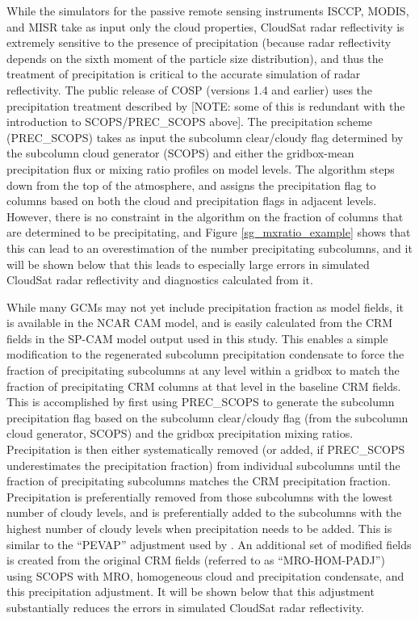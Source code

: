 While the simulators for the passive remote sensing instruments ISCCP, MODIS, and MISR take as input only the cloud properties, CloudSat radar reflectivity is extremely sensitive to the presence of precipitation (because radar reflectivity depends on the sixth moment of the particle size distribution), and thus the treatment of precipitation is critical to the accurate simulation of radar reflectivity. The public release of COSP (versions 1.4 and earlier) uses the precipitation treatment described by \cite{zhang_et_al_2010} [NOTE: some of this is redundant with the introduction to SCOPS/PREC\_SCOPS above]. The precipitation scheme (PREC\_SCOPS) takes as input the subcolumn clear/cloudy flag determined by the subcolumn cloud generator (SCOPS) and either the gridbox-mean precipitation flux or mixing ratio profiles on model levels. The algorithm steps down from the top of the atmosphere, and assigns the precipitation flag to columns based on both the cloud and precipitation flags in adjacent levels. However, there is no constraint in the algorithm on the fraction of columns that are determined to be precipitating, and Figure \ref{sg_mxratio_example} shows that this can lead to an overestimation of the number precipitating subcolumns, and it will be shown below that this leads to especially large errors in simulated CloudSat radar reflectivity and diagnostics calculated from it.

While many GCMs may not yet include precipitation fraction as model fields, it is available in the NCAR CAM model, and is easily calculated from the CRM fields in the SP-CAM model output used in this study. This enables a simple modification to the regenerated subcolumn precipitation condensate to force the fraction of precipitating subcolumns at any level within a gridbox to match the fraction of precipitating CRM columns at that level in the baseline CRM fields. This is accomplished by first using PREC\_SCOPS to generate the subcolumn precipitation flag based on the subcolumn clear/cloudy flag (from the subcolumn cloud generator, SCOPS) and the gridbox precipitation mixing ratios. Precipitation is then either systematically removed (or added, if PREC\_SCOPS underestimates the precipitation fraction) from individual subcolumns until the fraction of precipitating subcolumns matches the CRM precipitation fraction. Precipitation is preferentially removed from those subcolumns with the lowest number of cloudy levels, and is preferentially added to the subcolumns with the highest number of cloudy levels when precipitation needs to be added. This is similar to the ``PEVAP'' adjustment used by \cite{dimichele_et_al_2012}. An additional set of modified fields is created from the original CRM fields (referred to as ``MRO-HOM-PADJ'') using SCOPS with MRO, homogeneous cloud and precipitation condensate, and this precipitation adjustment. It will be shown below that this adjustment substantially reduces the errors in simulated CloudSat radar reflectivity.

